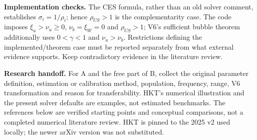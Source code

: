 \documentclass[10pt,a4paper,landscape]{article}
\begin{document}
\textbf{Implementation checks.} The CES formula, rather than an old solver comment, establishes $\sigma_i=1/\rho_i$; hence $\rho_{US}>1$ is the complementarity case. The code imposes $\xi_u>\nu_u\ge0$, $\nu_b=\xi_W=0$ and $\rho_{US}>1$; V6's sufficient bubble theorem additionally uses $0<\gamma<1$ and $\nu_u>\nu_b$. Restrictions defining the implemented/theorem case must be reported separately from what external evidence supports. Keep contradictory evidence in the literature review.

\textbf{Research handoff.} For A and the free part of B, collect the original parameter definition, estimation or calibration method, population, frequency, range, V6 transformation and reason for transferability. HKT's numerical illustration and the present solver defaults are examples, not estimated benchmarks. The references below are verified starting points and conceptual comparisons, not a completed numerical literature review. HKT is pinned to the 2025 v2 used locally; the newer arXiv version was not substituted.
\end{document}
